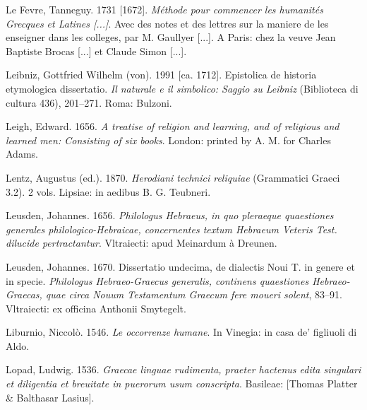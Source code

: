 \begin{styleStandard}
Le Fevre, Tanneguy. 1731 [1672]. \textit{Méthode pour commencer les humanités Grecques et Latines [...]}. Avec des notes et des lettres sur la maniere de les enseigner dans les colleges, par M. Gaullyer [...]. A Paris: chez la veuve Jean Baptiste Brocas [...] et Claude Simon [...].
\end{styleStandard}

\begin{styleStandard}
Leibniz, Gottfried Wilhelm (von). 1991 [ca. 1712]. Epistolica de historia etymologica dissertatio. \textit{Il naturale e il simbolico: Saggio su Leibniz} (Biblioteca di cultura 436), 201–271. Roma: Bulzoni.
\end{styleStandard}

\begin{styleStandard}
Leigh, Edward. 1656. \textit{A treatise of religion and learning, and of religious and learned men: Consisting of six books}. London: printed by A. M. for Charles Adams.
\end{styleStandard}

\begin{styleStandard}
Lentz, Augustus (ed.). 1870. \textit{Herodiani technici reliquiae} (Grammatici Graeci 3.2). 2 vols. Lipsiae: in aedibus B. G. Teubneri.
\end{styleStandard}

\begin{styleStandard}
Leusden, Johannes. 1656. \textit{Philologus Hebraeus, in quo pleraeque quaestiones generales philologico-Hebraicae, concernentes textum Hebraeum Veteris Test. dilucide pertractantur}. Vltraiecti: apud Meinardum à Dreunen.
\end{styleStandard}

\begin{styleStandard}
Leusden, Johannes. 1670. Dissertatio undecima, de dialectis Noui T. in genere et in specie. \textit{Philologus Hebraeo-Graecus generalis, continens quaestiones Hebraeo-Graecas, quae circa Nouum Testamentum Graecum fere moueri solent}, 83–91. Vltraiecti: ex officina Anthonii Smytegelt.
\end{styleStandard}

\begin{styleStandard}
Liburnio, Niccolò. 1546. \textit{Le occorrenze humane}. In Vinegia: in casa de’ figliuoli di Aldo.
\end{styleStandard}

\begin{styleStandard}
Lopad, Ludwig. 1536. \textit{Graecae linguae rudimenta, praeter hactenus edita singulari et diligentia et breuitate in puerorum usum conscripta}. Basileae: [Thomas Platter \& Balthasar Lasius].
\end{styleStandard}

